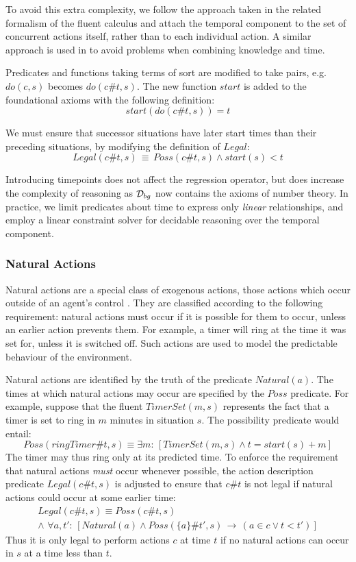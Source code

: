 To avoid this extra complexity, we follow the approach taken in the
related formalism of the fluent calculus \citep{martin03conc_flux}
and attach the temporal component to the set of concurrent actions
itself, rather than to each individual action. A similar approach
is used in \citep{scherl03conc_knowledge} to avoid problems when
combining knowledge and time.

Predicates and functions taking terms of sort  are modified
to take  pairs, e.g. $do(c,s)$ becomes
$do(c\#t,s)$. The new function $start$ is added to the foundational
axioms with the following definition:\[
start(do(c\#t,s))=t\]


We must ensure that successor situations have later start times than
their preceding situations, by modifying the definition of $Legal$:\[
Legal(c\#t,s)\,\equiv\, Poss(c\#t,s)\wedge start(s)<t\]


Introducing timepoints does not affect the regression operator, but
does increase the complexity of reasoning as $\mathcal{D}_{bg}$ now contains
the axioms of number theory. In practice, we limit predicates about
time to express only \emph{linear} relationships, and employ a linear
constraint solver for decidable reasoning over the temporal component.


\subsubsection{Natural Actions\label{sub:Background:Natural-Actions}}

Natural actions are a special class of exogenous actions, those actions
which occur outside of an agent's control \citep{reiter96sc_nat_conc}.
They are classified according to the following requirement: natural
actions must occur if it is possible for them to occur, unless an
earlier action prevents them. For example, a timer will ring at the
time it was set for, unless it is switched off. Such actions are used
to model the predictable behaviour of the environment.

Natural actions are identified by the truth of the predicate $Natural(a)$.
The times at which natural actions may occur are specified by the
$Poss$ predicate. For example, suppose that the fluent $TimerSet(m,s)$
represents the fact that a timer is set to ring in $m$ minutes in
situation $s$. The possibility predicate would entail:\[
Poss(ringTimer\#t,s)\equiv\exists m:\,\left[TimerSet(m,s)\wedge t=start(s)+m\right]\]
 The timer may thus ring only at its predicted time. To enforce the
requirement that natural actions \emph{must} occur whenever possible,
the action description predicate $Legal(c\#t,s)$ is adjusted to ensure
that $c\#t$ is not legal if natural actions could occur at some earlier
time:\begin{multline*}
Legal(c\#t,s)\equiv Poss(c\#t,s)\\
\wedge\,\,\forall a,t':\,\left[Natural(a)\wedge Poss(\{a\}\#t',s)\,\rightarrow\,\left(a\in c\vee t<t'\right)\right]\end{multline*}
 Thus it is only legal to perform actions $c$ at time $t$ if no
natural actions can occur in $s$ at a time less than $t$.

